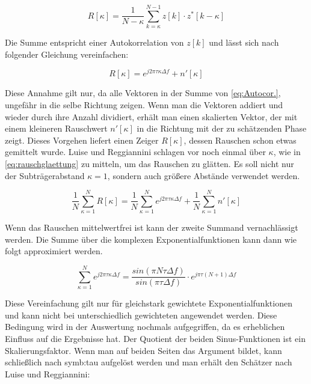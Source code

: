 \begin{equation}
	\label{eq:Autocor.}
	R[\kappa] = \frac{1}{N-\kappa} \sum_{k=\kappa}^{N-1} z[k]\cdot z^*[k-\kappa]
\end{equation}

Die Summe entspricht einer Autokorrelation von $z[k]$ und lässt sich nach folgender Gleichung vereinfachen:

\begin{equation}
	\label{eq:vereinfachung}
	R[\kappa] = e^{j2\pi \tau \kappa \Delta f} + n'[\kappa]
\end{equation}

Diese Annahme gilt nur, da alle Vektoren in der Summe von \eqref{eq:Autocor.}, ungefähr in die selbe Richtung zeigen. Wenn man die Vektoren addiert und wieder durch ihre Anzahl dividiert, erhält man einen skalierten Vektor, der mit einem kleineren Rauschwert $n'[\kappa]$ in die Richtung mit der zu schätzenden Phase zeigt. Dieses Vorgehen liefert einen Zeiger $R[\kappa]$, dessen Rauschen schon etwas gemittelt wurde. Luise und Reggiannini schlagen vor noch einmal über $\kappa$, wie in \eqref{eq:rauschglaettung} zu mitteln, um das Rauschen zu glätten. Es soll nicht nur der Subträgerabstand $\kappa=1$, sondern auch größere Abstände verwendet werden. 

\begin{equation}
	\label{eq:rauschglaettung}
	\frac{1}{N} \sum_{\kappa = 1}^{N} R[\kappa] = \frac{1}{N} \sum_{\kappa = 1}^{N} e^{j2\pi \tau \kappa \Delta f} + \frac{1}{N} \sum_{\kappa = 1}^{N}  n'[\kappa]
\end{equation}

Wenn das Rauschen mittelwertfrei ist kann der zweite Summand vernachlässigt werden. 
Die Summe über die komplexen Exponentialfunktionen kann dann wie folgt approximiert werden.

\begin{equation}
	\label{eq:Approximation}
	\sum_{\kappa = 1}^{N} e^{j2\pi  \tau \kappa	\Delta f} = \frac{sin(\pi N \tau \Delta f)}{sin(\pi \tau \Delta f)} \cdot e^{j\pi \tau  (N+1) \Delta f}
\end{equation}

Diese Vereinfachung gilt nur für gleichstark gewichtete Exponentialfunktionen und kann nicht bei unterschiedlich gewichteten angewendet werden. Diese Bedingung wird in der Auswertung nochmals aufgegriffen, da es erheblichen Einfluss auf die Ergebnisse hat.
Der Quotient der beiden Sinus-Funktionen ist ein Skalierungsfaktor. Wenn man auf beiden Seiten das Argument bildet, kann schließlich nach \gls{symb:tau} aufgelöst werden und man erhält den Schätzer nach Luise und Reggiannini:  

